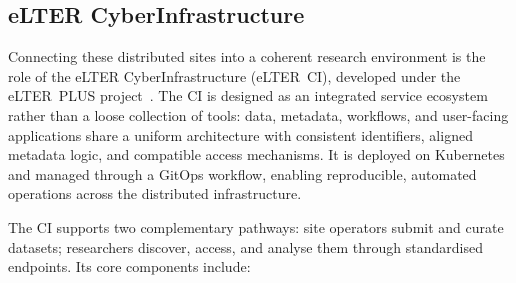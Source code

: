 \subsection{eLTER CyberInfrastructure}
\label{sec:bg-elter-ci}

Connecting these distributed sites into a coherent research environment is the
role of the eLTER CyberInfrastructure (eLTER~CI), developed under the eLTER~PLUS
project~\cite{elter-plus-d11.3}. The CI is designed as an integrated service ecosystem
rather than a loose collection of tools: data, metadata, workflows, and user-facing
applications share a uniform architecture with consistent identifiers, aligned metadata
logic, and compatible access mechanisms. It is deployed on Kubernetes and managed through
a GitOps workflow, enabling reproducible, automated operations across the distributed
infrastructure.

The CI supports two complementary pathways: site operators submit and curate datasets;
researchers discover, access, and analyse them through standardised endpoints. Its core
components include:

